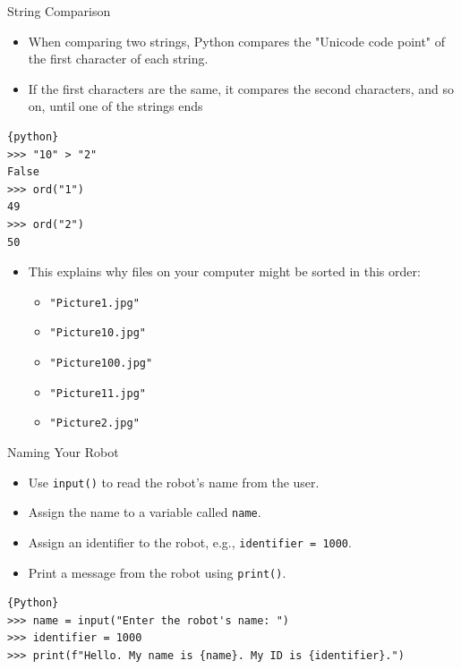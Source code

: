 \documentclass{beamer}
\begin{document}
\begin{frame}[fragile]{String Comparison}
    \begin{itemize}
        \item When comparing two strings, Python compares the "Unicode code point" of the first character of each string.
        \item If the first characters are the same, it compares the second characters, and so on, until one of the strings ends
    \end{itemize}
    \begin{lstlisting}{python}
>>> "10" > "2"
False
>>> ord("1")
49
>>> ord("2")
50
    \end{lstlisting}
    \begin{itemize}
        \item This explains why files on your computer might be sorted in this order:
        \begin{itemize}
            \item \texttt{"Picture1.jpg"}
            \item \texttt{"Picture10.jpg"}
            \item \texttt{"Picture100.jpg"}
            \item \texttt{"Picture11.jpg"}
            \item \texttt{"Picture2.jpg"}
        \end{itemize}
    \end{itemize}
\end{frame}


\begin{frame}[fragile]{Naming Your Robot}
    \begin{itemize}
        \item Use \texttt{input()} to read the robot's name from the user.
        \item Assign the name to a variable called \texttt{name}.
        \item Assign an identifier to the robot, e.g., \texttt{identifier = 1000}.
        \item Print a message from the robot using \texttt{print()}.
    \end{itemize}
    \begin{lstlisting}{Python}
>>> name = input("Enter the robot's name: ")
>>> identifier = 1000
>>> print(f"Hello. My name is {name}. My ID is {identifier}.")
    \end{lstlisting}
\end{frame}
\end{document}
